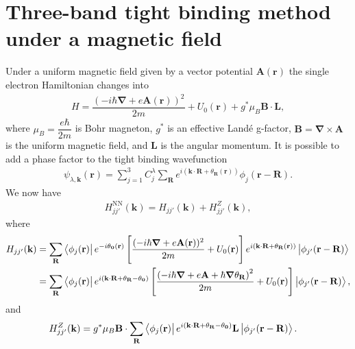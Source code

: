 \documentclass{report}
\newcommand{\f}[2]{\dfrac{#1}{#2}}
\begin{document}
\section{Three-band tight binding method under a magnetic field}
Under a uniform magnetic field given by a vector potential $\mathbf{A}(\mathbf{r})$ the single electron Hamiltonian changes into
\begin{align}
	H = \f{\left(-i\hbar \boldsymbol{\nabla} + e \mathbf{A(r)}\right)^{2}}{2m} + U_{0}(\mathbf{r}) + g^{*} \mu_{B} \mathbf{B} \cdot \mathbf{L},
\end{align}
where $\mu_{B} = \f{e\hbar}{2m}$ is Bohr magneton, $g^{*}$ is an effective Landé g-factor, $\mathbf{B} = \boldsymbol{\nabla} \times  \mathbf{A}$ is the uniform magnetic field, and $\mathbf{L}$ is the angular momentum. It is possible to add a phase factor to the tight binding wavefunction
\begin{align}
	\psi_{\lambda,\mathbf{k}} (\mathbf{r}) = \sum_{j=1}^{3} C_{j}^{\lambda} \sum_{\mathbf{R}} e^{i(\mathbf{k \cdot R} + \theta_{\mathbf{R}}(\mathbf{r}))} \phi_{j}(\mathbf{r} - \mathbf{R}).
\end{align}
We now have
\begin{align}
	H_{j j'}^{\text{NN}} (\mathbf{k}) = H_{jj'}(\mathbf{k}) + H_{jj'}^{Z}(\mathbf{k}),
\end{align}
where
\begin{equation}
	\begin{aligned}
		H_{jj'}(\mathbf{k})
		 & = \sum_{\mathbf{R}} \bra{\phi_{j}(\mathbf{r})} e^{-i \theta_{\mathbf{0}}(\mathbf{r})} \left[\f{(-i\hbar \boldsymbol{\nabla} + e \mathbf{A}(\mathbf{r}))^{2}}{2m} + U_{0}(\mathbf{r}) \right] e^{i (\mathbf{k}\cdot \mathbf{R} + \theta_{\mathbf{R}}(\mathbf{r}))} \ket{\phi_{j'}(\mathbf{r - R})}                \\
		 & = \sum_{\mathbf{R}} \bra{\phi_{j}(\mathbf{r})} e^{i(\mathbf{k \cdot R} +\theta_{\mathbf{R}} - \theta_{\mathbf{0}} )} \left[ \f{ \left( -i\hbar \boldsymbol{\nabla} + e \mathbf{A} + \hbar \boldsymbol{\nabla} \theta_{\mathbf{R}} \right)^{2} }{2m} + U_{0}(\mathbf{r}) \right] \ket{\phi_{j'}(\mathbf{r - R})},
	\end{aligned}
\end{equation}
and
\begin{align}
	H_{jj'}^{Z}(\mathbf{k})
	 & = g^{*} \mu_{B} \mathbf{B} \cdot \sum_{\mathbf{R}} \bra{\phi_{j}(\mathbf{r})} e^{i(\mathbf{k \cdot R} + \theta_{\mathbf{R}} - \theta_{\mathbf{0}} )} \mathbf{L} \ket{\phi_{j'}(\mathbf{r - R})}.
\end{align}
\end{document}
